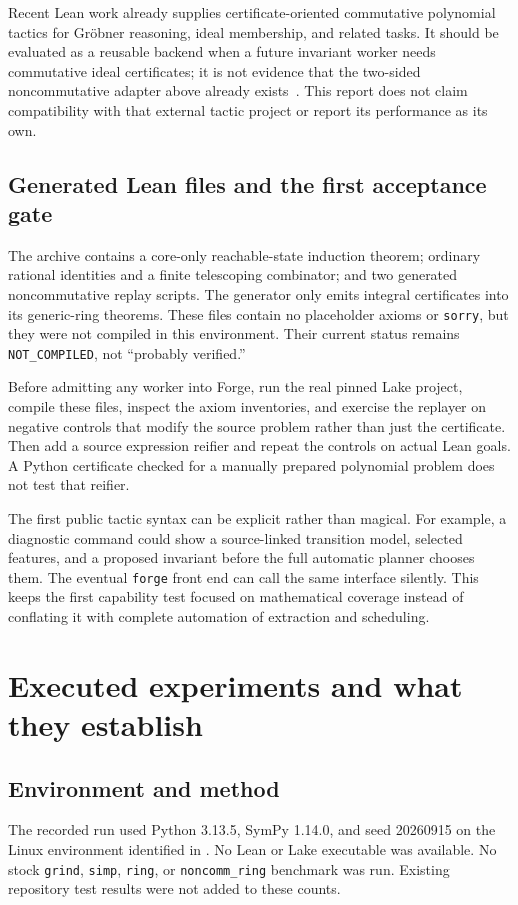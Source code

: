 \documentclass[11pt,letterpaper]{article}
\newcommand{\forge}{\texttt{forge}}\newcommand{\grind}{\texttt{grind}}
\newcommand{\code}[1]{\texttt{#1}}
\theoremstyle{definition}\newtheorem{definition}[theorem]{Definition}
\theoremstyle{remark}\newtheorem{remark}[theorem]{Remark}
\begin{document}
Recent Lean work already supplies certificate-oriented commutative polynomial
tactics for Gr\"obner reasoning, ideal membership, and related tasks. It should
be evaluated as a reusable backend when a future invariant worker needs
commutative ideal certificates; it is not evidence that the two-sided
noncommutative adapter above already exists~\cite{groebner-tactics}.
This report does not claim compatibility with that external tactic project or
report its performance as its own.

\subsection{Generated Lean files and the first acceptance gate}
The archive contains a core-only reachable-state induction theorem; ordinary
rational identities and a finite telescoping combinator; and two generated
noncommutative replay scripts. The generator only emits integral certificates
into its generic-ring theorems. These files contain no placeholder axioms or
\code{sorry}, but they were not compiled in this environment. Their current
status remains \code{NOT\_COMPILED}, not ``probably verified.''

Before admitting any worker into Forge, run the real pinned Lake project,
compile these files, inspect the axiom inventories, and exercise the replayer
on negative controls that modify the source problem rather than just the
certificate. Then add a source expression reifier and repeat the controls on
actual Lean goals. A Python certificate checked for a manually prepared
polynomial problem does not test that reifier.

The first public tactic syntax can be explicit rather than magical. For
example, a diagnostic command could show a source-linked transition model,
selected features, and a proposed invariant before the full automatic planner
chooses them. The eventual \forge{} front end can call the same interface
silently. This keeps the first capability test focused on mathematical
coverage instead of conflating it with complete automation of extraction and
scheduling.

\section{Executed experiments and what they establish}
\label{sec:experiments}

\subsection{Environment and method}
The recorded run used Python 3.13.5, SymPy 1.14.0, and seed 20260915 on the
Linux environment identified in . No Lean or Lake
executable was available. No stock \grind{}, \code{simp}, \code{ring}, or
\code{noncomm\_ring} benchmark was run. Existing repository test results were
not added to these counts.
\end{document}

